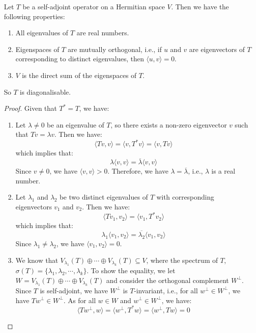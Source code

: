 \begin{proposition}
	Let $T$ be a self-adjoint operator on a Hermitian space $V$. Then we have the following properties:
	\begin{enumerate}
		\item All eigenvalues of $T$ are real numbers.
		\item Eigenspaces of $T$ are mutually orthogonal, i.e., if $u$ and $v$ are eigenvectors of $T$ corresponding to distinct eigenvalues, then $\langle u, v \rangle = 0$.
		\item $V$ is the direct sum of the eigenspaces of $T$.
	\end{enumerate}
	So $T$ is diagonalisable.
\end{proposition}
\begin{proof}
	Given that $T^* = T$, we have:
	\begin{enumerate}[label = (\arabic*)]
		\item Let $\lambda \neq 0$ be an eigenvalue of $T$, so there exists a non-zero eigenvector $v$ such that $Tv = \lambda v$. Then we have:
		      \[
			      \langle Tv, v \rangle = \langle v, T^* v \rangle = \langle v, Tv \rangle
		      \]
		      which implies that:
		      \[
			      \lambda \langle v, v \rangle = \overline{\lambda} \langle v, v \rangle
		      \]
		      Since $v \neq 0$, we have $\langle v, v \rangle > 0$. Therefore, we have $\lambda = \overline{\lambda}$, i.e., $\lambda$ is a real number.
		\item Let $\lambda_1$ and $\lambda_2$ be two distinct eigenvalues of $T$ with corresponding eigenvectors $v_1$ and $v_2$. Then we have:
		      \[
			      \langle Tv_1, v_2 \rangle = \langle v_1, T^* v_2 \rangle
		      \]
		      which implies that:
		      \[
			      \lambda_1 \langle v_1, v_2 \rangle = \overline{\lambda_2} \langle v_1, v_2 \rangle
		      \]
		      Since $\lambda_1 \neq \lambda_2$, we have $\langle v_1, v_2 \rangle = 0$.
		\item We know that $V_{\lambda_1} (T) \oplus \cdots \oplus V_{\lambda_k} (T) \subseteq V$, where the spectrum of $T$, $\sigma(T) = \{ \lambda_1, \lambda_2, \cdots, \lambda_k \}$. To show the equality, we let $W = V_{\lambda_1} (T) \oplus \cdots \oplus V_{\lambda_k} (T)$ and consider the orthogonal complement $W^\perp$. Since $T$ is self-adjoint, we have $W^\perp$ is $T$-invariant, i.e., for all $w^\perp \in W^\perp$, we have $T w^\perp \in W^\perp$. As for all $w \in W$ and $w^\perp \in W^\perp$, we have:
		      \[
			      \langle T w^\perp, w \rangle = \langle w^\perp, T^* w \rangle = \langle w^\perp, T w \rangle = 0
\]
\end{enumerate}
\end{proof}
